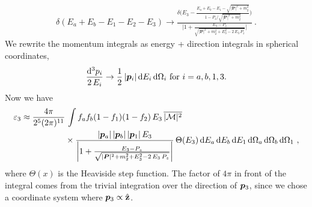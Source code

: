 \begin{align}
    \delta(E_a + E_b - E_1 - E_2 - E_3) 
    \rightarrow 
    \frac{\delta\bigg(
        E_3 -     
        \frac{E_a + E_b - E_1 - \sqrt{|\bm{P}|^2 + m_2^2}}{1 - P_z / \sqrt{|\bm{P}|^2 + m_2^2}}
    \bigg)}
    {
    \bigg|
        1 + \frac{E_3 - P_z}{\sqrt{|\bm{P}|^2 + m_2^2 + E_3^2 - 2 \, E_3 \, P_z}}
    \bigg|
    } \ .
\end{align}
We rewrite the momentum integrals as energy + direction integrals in spherical coordinates, 
\begin{align}
    \frac{\dd^3 p_i}{2 \, E_i} \rightarrow
    \frac{1}{2} \, \pmag[i] \, \dd E_i \, \dd \Omega_i \ \text{for } i = a, b, 1, 3. 
\end{align}
Now we have
\begin{equation}
    \begin{aligned}
        \label{eq:dumb-approximate-integral}
        \varepsilon_3 \approx 
        \frac{4 \pi}{2^5 (2\pi)^{11}} &
        \, \int 
        f_a f_b (1 - f_1) (1 - f_2)
        \, E_3
        \, \overline{|\mathcal{M}|^2} \\
        & \times
        \frac{
            \pmag[a] 
            \, \pmag[b]
            \, \pmag[1]
            \, E_3
            }{
                \bigg|
                1 + \frac{E_3 - P_z}{\sqrt{|\bm{P}|^2 + m_2^2 + E_3^2 - 2 \, E_3 \, P_z}}
                \bigg|
            }
        \, \Theta(E_3)
        \, \dd E_a 
        \, \dd E_b
        \, \dd E_1
        \, \dd \Omega_a
        \, \dd \Omega_b
        \, \dd \Omega_1
        \ ,
    \end{aligned}
\end{equation}
where $\Theta(x)$ is the Heaviside step function. The factor of $4\pi$ in front of the integral comes from the trivial integration over the direction of $\pvec[3]$, since we chose a coordinate system where $\pvec[3] \propto \hat{\mathbf{z}}$.
